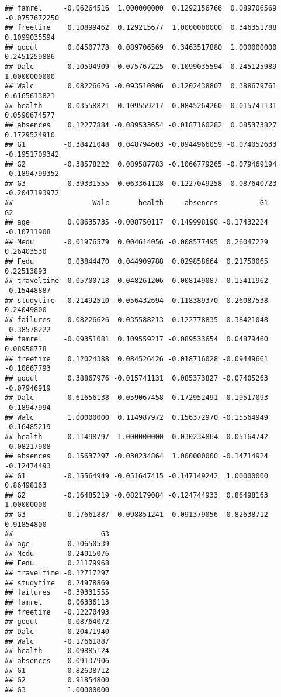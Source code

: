 \documentclass[
]{article}
\begin{document}
\begin{verbatim}
## famrel     -0.06264516  1.000000000  0.1292156766  0.089706569 -0.0757672250
## freetime    0.10899462  0.129215677  1.0000000000  0.346351788  0.1099035594
## goout       0.04507778  0.089706569  0.3463517880  1.000000000  0.2451259886
## Dalc        0.10594909 -0.075767225  0.1099035594  0.245125989  1.0000000000
## Walc        0.08226626 -0.093510806  0.1202438807  0.388679761  0.6165613821
## health      0.03558821  0.109559217  0.0845264260 -0.015741131  0.0590674577
## absences    0.12277884 -0.089533654 -0.0187160282  0.085373827  0.1729524910
## G1         -0.38421048  0.048794603 -0.0944966059 -0.074052633 -0.1951709342
## G2         -0.38578222  0.089587783 -0.1066779265 -0.079469194 -0.1894799352
## G3         -0.39331555  0.063361128 -0.1227049258 -0.087640723 -0.2047193972
##                   Walc       health     absences          G1          G2
## age         0.08635735 -0.008750117  0.149998190 -0.17432224 -0.10711908
## Medu       -0.01976579  0.004614056 -0.008577495  0.26047229  0.26403530
## Fedu        0.03844470  0.044909788  0.029858664  0.21750065  0.22513893
## traveltime  0.05700718 -0.048261206 -0.008149087 -0.15411962 -0.15448887
## studytime  -0.21492510 -0.056432694 -0.118389370  0.26087538  0.24049800
## failures    0.08226626  0.035588213  0.122778835 -0.38421048 -0.38578222
## famrel     -0.09351081  0.109559217 -0.089533654  0.04879460  0.08958778
## freetime    0.12024388  0.084526426 -0.018716028 -0.09449661 -0.10667793
## goout       0.38867976 -0.015741131  0.085373827 -0.07405263 -0.07946919
## Dalc        0.61656138  0.059067458  0.172952491 -0.19517093 -0.18947994
## Walc        1.00000000  0.114987972  0.156372970 -0.15564949 -0.16485219
## health      0.11498797  1.000000000 -0.030234864 -0.05164742 -0.08217908
## absences    0.15637297 -0.030234864  1.000000000 -0.14714924 -0.12474493
## G1         -0.15564949 -0.051647415 -0.147149242  1.00000000  0.86498163
## G2         -0.16485219 -0.082179084 -0.124744933  0.86498163  1.00000000
## G3         -0.17661887 -0.098851241 -0.091379056  0.82638712  0.91854800
##                     G3
## age        -0.10650539
## Medu        0.24015076
## Fedu        0.21179968
## traveltime -0.12717297
## studytime   0.24978869
## failures   -0.39331555
## famrel      0.06336113
## freetime   -0.12270493
## goout      -0.08764072
## Dalc       -0.20471940
## Walc       -0.17661887
## health     -0.09885124
## absences   -0.09137906
## G1          0.82638712
## G2          0.91854800
## G3          1.00000000
\end{verbatim}
\end{document}
